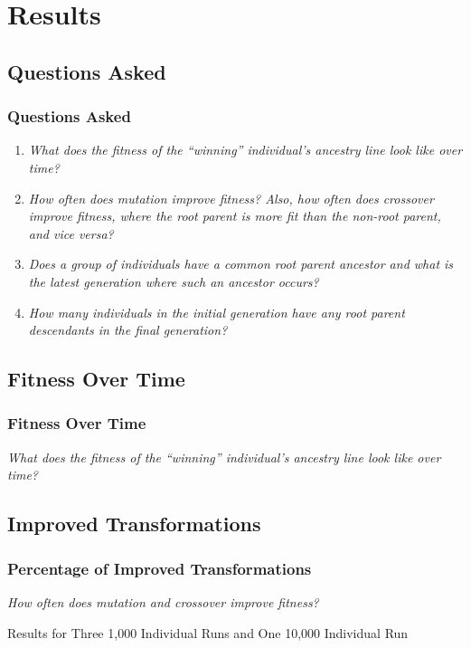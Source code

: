 \documentclass{beamer}
\begin{document}
\section[Results]{Results}

\subsection[Questions Asked]{Questions Asked}

\begin{frame}
\frametitle{Questions Asked}
\begin{enumerate}
\item \emph{What does the fitness of the ``winning'' individual's ancestry line look like over time?}
\item \emph{How often does mutation improve fitness? Also, how often does crossover improve fitness, where the root parent is more fit than the non-root parent, and vice versa?}
\item \emph{Does a group of individuals have a common root parent ancestor and what is the latest generation where such an ancestor occurs?}
\item \emph{How many individuals in the initial generation have any root parent descendants in the final generation?}
\end{enumerate}
\end{frame}

\subsection[Fitness Graph]{Fitness Over Time}

\begin{frame}
\frametitle{Fitness Over Time}
\emph{What does the fitness of the ``winning'' individual's ancestry line look like over time?}
\begin{center}
\end{center}
\end{frame}

\subsection[Improved Transformations]{Improved Transformations}

\begin{frame}
\frametitle{Percentage of Improved Transformations}
\emph{How often does mutation and crossover improve fitness?}
\begin{center}
{\tiny Results for Three 1,000 Individual Runs and One 10,000 Individual Run}
\end{center}
\end{frame}
\end{document}
